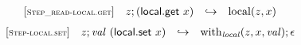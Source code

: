 \documentclass{article}
\begin{document}
$$
\begin{array}{@{}l@{}rcl@{}l@{}}
{[\textsc{\scriptsize Step\_read{-}local.get}]} \quad & z ; (\mathsf{local.get}~x) &\hookrightarrow& {\mathrm{local}}(z, x) \\
\end{array}
$$
$$
\begin{array}{@{}l@{}rcl@{}l@{}}
{[\textsc{\scriptsize Step{-}local.set}]} \quad & z ; {\mathit{val}}~(\mathsf{local.set}~x) &\hookrightarrow& {\mathrm{with}}_{\mathit{local}}(z, x, {\mathit{val}}) ; \epsilon \\
\end{array}
$$
\end{document}
